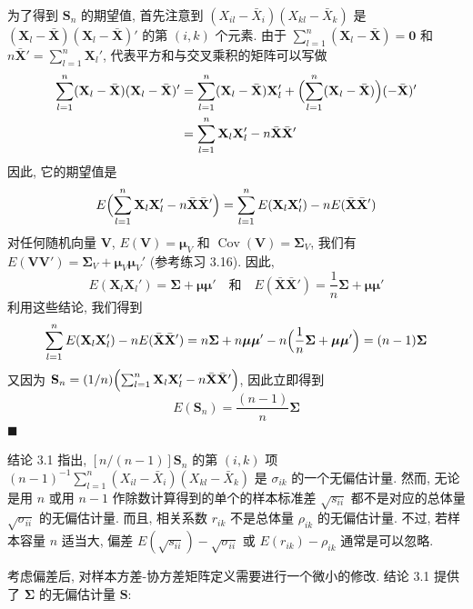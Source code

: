 为了得到 $\mathbf{S}_{n}$ 的期望值, 首先注意到 $(X_{il}-\bar{X}_{i})(X_{kl}-\bar{X}_{k})$ 是 $(\mathbf{X}_{l}-\bar{\mathbf{X}})(\mathbf{X}_{l}-\bar{\mathbf{X}})'$ 的第 $(i,k)$ 个元素. 由于 $\sum_{l=1}^{n}(\mathbf{X}_{l}-\bar{\mathbf{X}})=\mathbf{0}$ 和 $n\bar{\mathbf{X}}'=\sum_{l=1}^{n}\mathbf{X}_{l}'$, 代表平方和与交叉乘积的矩阵可以写做
\begin{align*}
\sum_{l=1}^{n}(\mathbf{X}_{l}-\bar{\mathbf{X}})(\mathbf{X}_{l}-\bar{\mathbf{X}})'
&=\sum_{l=1}^{n}(\mathbf{X}_{l}-\bar{\mathbf{X}})\mathbf{X}_{l}'+\Bigl(\sum_{l=1}^{n}(\mathbf{X}_{l}-\bar{\mathbf{X}})\Bigr)(-\bar{\mathbf{X}})'\\
&=\sum_{l=1}^{n}\mathbf{X}_{l}\mathbf{X}_{l}'-n\bar{\mathbf{X}}\bar{\mathbf{X}}'
\end{align*}
因此, 它的期望值是
\[
E\Bigl(\sum_{l=1}^{n}\mathbf{X}_{l}\mathbf{X}_{l}'-n\bar{\mathbf{X}}\bar{\mathbf{X}}'\Bigr)=\sum_{l=1}^{n}E(\mathbf{X}_{l}\mathbf{X}_{l}')-nE(\bar{\mathbf{X}}\bar{\mathbf{X}}')
\]
对任何随机向量 $\mathbf{V}$, $E(\mathbf{V})=\boldsymbol{\mu}_{V}$ 和 $\operatorname{Cov}(\mathbf{V})=\boldsymbol{\Sigma}_{V}$, 我们有 $E(\mathbf{V}\mathbf{V}')=\boldsymbol{\Sigma}_{V}+\boldsymbol{\mu}_{V}\boldsymbol{\mu}_{V}'$ (参考练习 3.16). 因此,
\[
E(\mathbf{X}_{l}\mathbf{X}_{l}')=\boldsymbol{\Sigma}+\boldsymbol{\mu}\boldsymbol{\mu}'\quad\text{和}\quad
E(\bar{\mathbf{X}}\bar{\mathbf{X}}')=\frac{1}{n}\boldsymbol{\Sigma}+\boldsymbol{\mu}\boldsymbol{\mu}'
\]
利用这些结论, 我们得到
\[
\sum_{l=1}^{n}E(\mathbf{X}_{l}\mathbf{X}_{l}')-nE(\bar{\mathbf{X}}\bar{\mathbf{X}}')
=n\boldsymbol{\Sigma}+n\boldsymbol{\mu}\boldsymbol{\mu}'-n\Bigl(\frac{1}{n}\boldsymbol{\Sigma}+\boldsymbol{\mu}\boldsymbol{\mu}'\Bigr)=(n-1)\boldsymbol{\Sigma}
\]
又因为 $\mathbf{S}_{n}=(1/n)\Bigl(\sum_{l=1}^{n}\mathbf{X}_{l}\mathbf{X}_{l}'-n\bar{\mathbf{X}}\bar{\mathbf{X}}'\Bigr)$, 因此立即得到
\[
E(\mathbf{S}_{n})=\frac{(n-1)}{n}\boldsymbol{\Sigma}
\]
\hfill$\blacksquare$

结论 3.1 指出, $[n/(n-1)]\mathbf{S}_{n}$ 的第 $(i,k)$ 项 $(n-1)^{-1}\sum_{l=1}^{n}(X_{il}-\bar{X}_{i})(X_{kl}-\bar{X}_{k})$ 是 $\sigma_{ik}$ 的一个无偏估计量. 然而, 无论是用 $n$ 或用 $n-1$ 作除数计算得到的单个的样本标准差 $\sqrt{s_{ii}}$ 都不是对应的总体量 $\sqrt{\sigma_{ii}}$ 的无偏估计量. 而且, 相关系数 $r_{ik}$ 不是总体量 $\rho_{ik}$ 的无偏估计量. 不过, 若样本容量 $n$ 适当大, 偏差 $E(\sqrt{s_{ii}})-\sqrt{\sigma_{ii}}$ 或 $E(r_{ik})-\rho_{ik}$ 通常是可以忽略.

考虑偏差后, 对样本方差-协方差矩阵定义需要进行一个微小的修改. 结论 3.1 提供了 $\boldsymbol{\Sigma}$ 的无偏估计量 $\mathbf{S}$:

